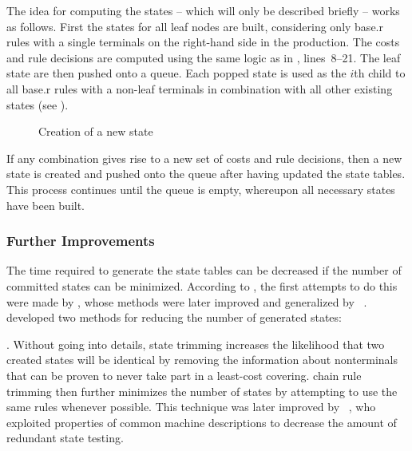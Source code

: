The idea for computing the \glspl{state} -- which will only be described briefly
-- works as follows.
%
First the states for all leaf \glspl{node} are built, considering only
\gls{base.r} \glspl{rule} with a single \glspl{terminal} on the right-hand side
in the \gls{production}.
%
The costs and \gls{rule} decisions are computed using the same logic as in
, lines~\mbox{\num{8}--\num{21}}.
%
The leaf \gls{state} are then pushed onto a queue.
%
Each popped \gls{state} is used as the $i$th child to all \gls{base.r}
\glspl{rule} with a non-leaf \glspl{terminal} in combination with all other
existing \glspl{state} (see ).
%
\begin{figure}
  \centering%
  

  \caption{Creation of a new state}
\end{figure}
%
If any combination gives rise to a new set of costs and \gls{rule} decisions,
then a new \gls{state} is created and pushed onto the queue after having updated
the \glspl{state table}.
%
This process continues until the queue is empty, whereupon all necessary
\glspl{state} have been built.


\subsubsection{Further Improvements}

The time required to generate the \gls{state} tables can be decreased if the
number of committed \glspl{state} can be minimized.
%
According to \textcite{Proebsting:1992:BURS}, the first attempts to do this were
made by \textcite{Henry:1989}, whose methods were later improved and generalized
by \citeauthor{Proebsting:1992:BURS}~\cite{Proebsting:1992:BURS,
  Proebsting:1995:BURS}.
%
\citeauthor{Proebsting:1992:BURS} developed two methods for reducing the number
of generated \glspl{state}:
%
.
%
Without going into details, \gls{state trimming} increases the likelihood that
two created \glspl{state} will be identical by removing the information about
\glspl{nonterminal} that can be proven to never take part in a least-cost
covering.
%
\Gls{chain rule trimming} then further minimizes the number of \glspl{state} by
attempting to use the same \glspl{rule} whenever possible.
%
This technique was later improved by
\citeauthor{KangChoe:1995}~\cite{KangChoe:1995, Kang:2004}, who exploited
properties of common \glspl{machine description} to decrease the amount of
redundant \gls{state} testing.


